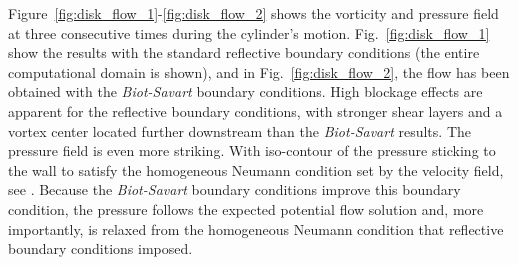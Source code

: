 \documentclass{article}
\begin{document}
Figure~\ref{fig:disk_flow_1}-\ref{fig:disk_flow_2} shows the vorticity and pressure field at three consecutive times during the cylinder's motion. Fig.~\ref{fig:disk_flow_1} show the results with the standard reflective boundary conditions (the entire computational domain is shown), and in Fig.~\ref{fig:disk_flow_2}, the flow has been obtained with the \emph{Biot-Savart} boundary conditions. High blockage effects are apparent for the reflective boundary conditions, with stronger shear layers and a vortex center located further downstream than the \emph{Biot-Savart} results. The pressure field is even more striking. With iso-contour of the pressure sticking to the wall to satisfy the homogeneous Neumann condition set by the velocity field, see \cite{}. Because the \emph{Biot-Savart} boundary conditions improve this boundary condition, the pressure follows the expected potential flow solution and, more importantly, is relaxed from the homogeneous Neumann condition that reflective boundary conditions imposed.
\end{document}
